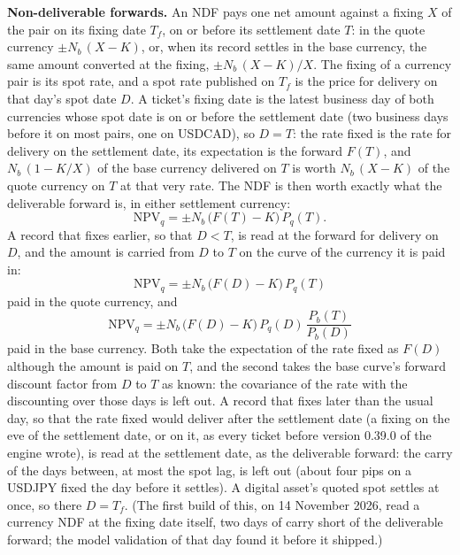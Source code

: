 \documentclass[11pt,a4paper]{article}
\begin{document}
\textbf{Non-deliverable forwards.} An NDF pays one net amount against a fixing $X$ of the pair on its fixing date $T_f$, on or before its settlement date $T$: in the quote currency $\pm N_b\,(X-K)$, or, when its record settles in the base currency, the same amount converted at the fixing, $\pm N_b\,(X-K)/X$. The fixing of a currency pair is its spot rate, and a spot rate published on $T_f$ is the price for delivery on that day's spot date $D$. A ticket's fixing date is the latest business day of both currencies whose spot date is on or before the settlement date (two business days before it on most pairs, one on USDCAD), so $D=T$: the rate fixed is the rate for delivery on the settlement date, its expectation is the forward $F(T)$, and $N_b\,(1-K/X)$ of the base currency delivered on $T$ is worth $N_b\,(X-K)$ of the quote currency on $T$ at that very rate. The NDF is then worth exactly what the deliverable forward is, in either settlement currency:
\begin{equation}
\mathrm{NPV}_q=\pm N_b\,\bigl(F(T)-K\bigr)\,P_q(T).
\end{equation}
A record that fixes earlier, so that $D<T$, is read at the forward for delivery on $D$, and the amount is carried from $D$ to $T$ on the curve of the currency it is paid in:
\begin{equation}
\mathrm{NPV}_q=\pm N_b\,\bigl(F(D)-K\bigr)\,P_q(T)
\end{equation}
paid in the quote currency, and
\begin{equation}
\mathrm{NPV}_q=\pm N_b\,\bigl(F(D)-K\bigr)\,P_q(D)\,\frac{P_b(T)}{P_b(D)}
\end{equation}
paid in the base currency. Both take the expectation of the rate fixed as $F(D)$ although the amount is paid on $T$, and the second takes the base curve's forward discount factor from $D$ to $T$ as known: the covariance of the rate with the discounting over those days is left out. A record that fixes later than the usual day, so that the rate fixed would deliver after the settlement date (a fixing on the eve of the settlement date, or on it, as every ticket before version 0.39.0 of the engine wrote), is read at the settlement date, as the deliverable forward: the carry of the days between, at most the spot lag, is left out (about four pips on a USDJPY fixed the day before it settles). A digital asset's quoted spot settles at once, so there $D=T_f$. (The first build of this, on 14 November 2026, read a currency NDF at the fixing date itself, two days of carry short of the deliverable forward; the model validation of that day found it before it shipped.)
\end{document}
